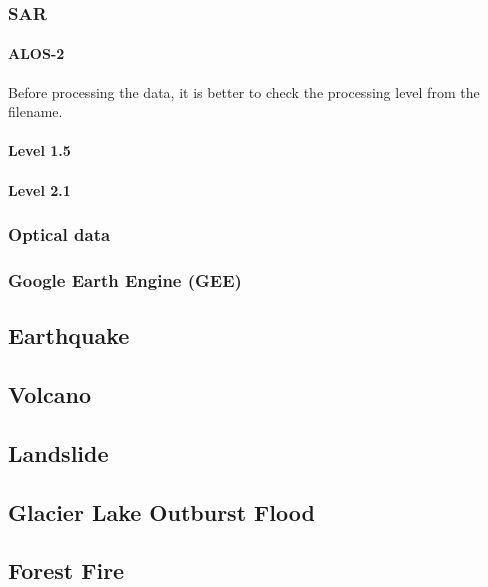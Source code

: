 \documentclass[]{book}
\let\oldparagraph\paragraph
\renewcommand{\paragraph}[1]{\oldparagraph{#1}\mbox{}}
\begin{document}
\subsubsection{SAR}\label{sar}

\paragraph{ALOS-2}\label{alos-2}

Before processing the data, it is better to check the processing level
from the filename.

\paragraph{Level 1.5}\label{level-1.5}

\paragraph{Level 2.1}\label{level-2.1}

\subsubsection{Optical data}\label{optical-data}

\subsubsection{Google Earth Engine (GEE)}\label{google-earth-engine-gee}

\subsection{Earthquake}\label{earthquake}

\subsection{Volcano}\label{volcano}

\subsection{Landslide}\label{landslide}

\subsection{Glacier Lake Outburst
Flood}\label{glacier-lake-outburst-flood}

\subsection{Forest Fire}\label{forest-fire}
\end{document}
